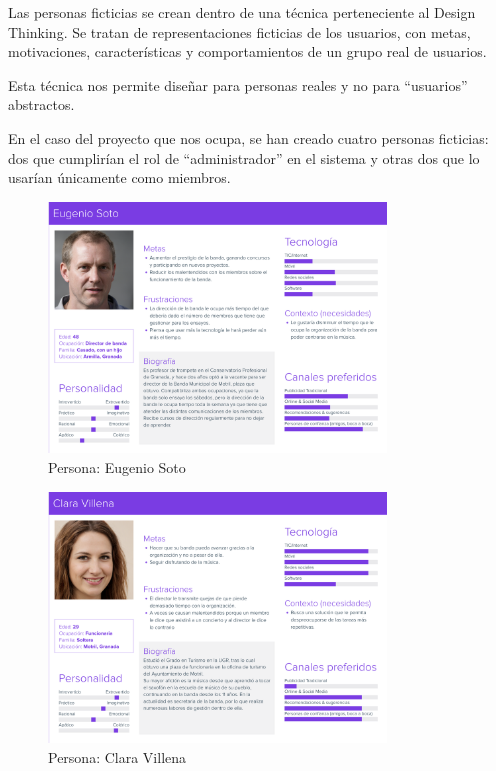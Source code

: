 Las personas ficticias se crean dentro de una técnica perteneciente al Design Thinking. Se tratan de representaciones ficticias de los usuarios, con metas, motivaciones, características y comportamientos de un grupo real de usuarios.\cite{personnas}

Esta técnica nos permite diseñar para personas reales y no para ``usuarios'' abstractos.

En el caso del proyecto que nos ocupa, se han creado cuatro personas ficticias: dos que cumplirían el rol de ``administrador'' en el sistema y otras dos que lo usarían únicamente como miembros.

\begin{figure}[h]
\centering
\includegraphics[width=0.8\textwidth]{imagenes/personas/persona_eugenio.png}
\caption{Persona: Eugenio Soto}
\label{fig:persona_eugenio}
\end{figure}

\begin{figure}[h]
\centering
\includegraphics[width=0.8\textwidth]{imagenes/personas/persona_clara.png}
\caption{Persona: Clara Villena}
\label{fig:persona_clara}
\end{figure}


